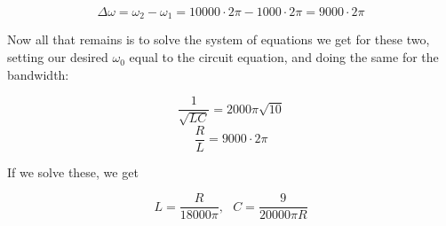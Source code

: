 \documentclass[12pt,a4paper]{report}
\begin{document}
\[ \Delta \omega = \omega_2 - \omega_1 = 10000 \cdot 2\pi - 1000 \cdot 2\pi = 9000 \cdot 2\pi \]

Now all that remains is to solve the system of equations we get for these two, setting our desired $\omega_0$ equal to the circuit equation, and doing the same for the bandwidth:

\[ \frac{1}{\sqrt{LC}} = 2000\pi \sqrt{10} \]
\[ \frac{R}{L} = 9000 \cdot 2\pi \]

If we solve these, we get

\[ L = \frac{R}{18000 \pi},\text{ } C = \frac{9}{20000 \pi R} \]

\end{document}
